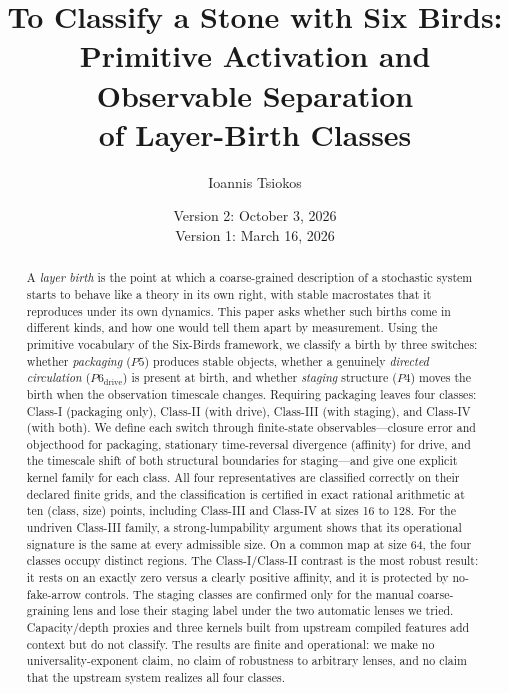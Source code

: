 \title{To Classify a Stone with Six Birds:\\[4pt]
Primitive Activation and Observable Separation\\[2pt]
of Layer-Birth Classes}
\author{Ioannis Tsiokos\;\orcidA{}}
\date{Version 2: October 3, 2026\\[2pt]
\small Version 1: March 16, 2026}

\maketitle
\thispagestyle{firstpage}

\begin{abstract}
\noindent
A \emph{layer birth} is the point at which a coarse-grained description of a stochastic system starts to behave like a theory in its own right, with stable macrostates that it reproduces under its own dynamics. This paper asks whether such births come in different kinds, and how one would tell them apart by measurement. Using the primitive vocabulary of the Six-Birds framework, we classify a birth by three switches: whether \emph{packaging} ($P5$) produces stable objects, whether a genuinely \emph{directed circulation} ($P6_{\mathrm{drive}}$) is present at birth, and whether \emph{staging} structure ($P4$) moves the birth when the observation timescale changes. Requiring packaging leaves four classes: Class-I (packaging only), Class-II (with drive), Class-III (with staging), and Class-IV (with both). We define each switch through finite-state observables---closure error and objecthood for packaging, stationary time-reversal divergence (affinity) for drive, and the timescale shift of both structural boundaries for staging---and give one explicit kernel family for each class. All four representatives are classified correctly on their declared finite grids, and the classification is certified in exact rational arithmetic at ten (class, size) points, including Class-III and Class-IV at sizes 16 to 128. For the undriven Class-III family, a strong-lumpability argument shows that its operational signature is the same at every admissible size. On a common map at size 64, the four classes occupy distinct regions. The Class-I/Class-II contrast is the most robust result: it rests on an exactly zero versus a clearly positive affinity, and it is protected by no-fake-arrow controls. The staging classes are confirmed only for the manual coarse-graining lens and lose their staging label under the two automatic lenses we tried. Capacity/depth proxies and three kernels built from upstream compiled features add context but do not classify. The results are finite and operational: we make no universality-exponent claim, no claim of robustness to arbitrary lenses, and no claim that the upstream system realizes all four classes.
\end{abstract}

\bigskip
